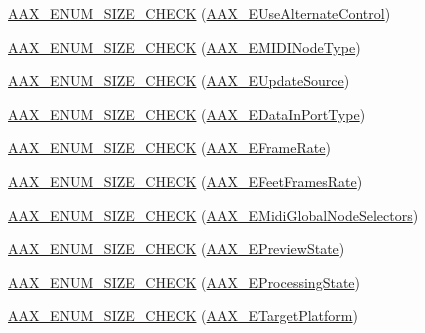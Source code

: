 \begin{DoxyCompactItemize}
\item 
\hyperlink{a00206_a7becfade6ef2832f33559c576c0229b8}{A\+A\+X\+\_\+\+E\+N\+U\+M\+\_\+\+S\+I\+Z\+E\+\_\+\+C\+H\+E\+C\+K} (\hyperlink{a00206_abbcc8b4e8207262a5dd9e32047a51a29}{A\+A\+X\+\_\+\+E\+Use\+Alternate\+Control})
\item 
\hyperlink{a00206_a4846f0566f755423b00339b1d0c30286}{A\+A\+X\+\_\+\+E\+N\+U\+M\+\_\+\+S\+I\+Z\+E\+\_\+\+C\+H\+E\+C\+K} (\hyperlink{a00206_a5e1dffce35d05990dbbad651702678e4}{A\+A\+X\+\_\+\+E\+M\+I\+D\+I\+Node\+Type})
\item 
\hyperlink{a00206_aff578795a76f6d946b6f22297cf34122}{A\+A\+X\+\_\+\+E\+N\+U\+M\+\_\+\+S\+I\+Z\+E\+\_\+\+C\+H\+E\+C\+K} (\hyperlink{a00206_a30be0398faf20c6b121239eb9399f3f7}{A\+A\+X\+\_\+\+E\+Update\+Source})
\item 
\hyperlink{a00206_af6976d8f2262bc8a5c4764a400369c0b}{A\+A\+X\+\_\+\+E\+N\+U\+M\+\_\+\+S\+I\+Z\+E\+\_\+\+C\+H\+E\+C\+K} (\hyperlink{a00206_ab5677b173ad8647c24d34d28272d11fc}{A\+A\+X\+\_\+\+E\+Data\+In\+Port\+Type})
\item 
\hyperlink{a00206_aa81099aa0185ad9be2192c1a5b7e00ce}{A\+A\+X\+\_\+\+E\+N\+U\+M\+\_\+\+S\+I\+Z\+E\+\_\+\+C\+H\+E\+C\+K} (\hyperlink{a00206_a1271a51553bf508de59864334111aa8f}{A\+A\+X\+\_\+\+E\+Frame\+Rate})
\item 
\hyperlink{a00206_a91aa2cdae6c91defa1505e50e841859c}{A\+A\+X\+\_\+\+E\+N\+U\+M\+\_\+\+S\+I\+Z\+E\+\_\+\+C\+H\+E\+C\+K} (\hyperlink{a00206_a8a0c9dafef741a26ee8c06f7285a0dfa}{A\+A\+X\+\_\+\+E\+Feet\+Frames\+Rate})
\item 
\hyperlink{a00206_a41a000edf84a9a60ce852e7707deee96}{A\+A\+X\+\_\+\+E\+N\+U\+M\+\_\+\+S\+I\+Z\+E\+\_\+\+C\+H\+E\+C\+K} (\hyperlink{a00206_a349dae6bc64bda67a5440cbc6637f92d}{A\+A\+X\+\_\+\+E\+Midi\+Global\+Node\+Selectors})
\item 
\hyperlink{a00206_a4f26045654b3373a3ddd5e3323e4c2a0}{A\+A\+X\+\_\+\+E\+N\+U\+M\+\_\+\+S\+I\+Z\+E\+\_\+\+C\+H\+E\+C\+K} (\hyperlink{a00206_a12b280d7ccf22568759f8deb1fe1d6a8}{A\+A\+X\+\_\+\+E\+Preview\+State})
\item 
\hyperlink{a00206_abf9e76227a06a4e03facdc9740c663af}{A\+A\+X\+\_\+\+E\+N\+U\+M\+\_\+\+S\+I\+Z\+E\+\_\+\+C\+H\+E\+C\+K} (\hyperlink{a00206_a6ec854be40c8cf810dec97de3e56c0a7}{A\+A\+X\+\_\+\+E\+Processing\+State})
\item 
\hyperlink{a00206_a8e78dfa90ba7ea61b8260f8d919c8428}{A\+A\+X\+\_\+\+E\+N\+U\+M\+\_\+\+S\+I\+Z\+E\+\_\+\+C\+H\+E\+C\+K} (\hyperlink{a00206_a19e8cc27f59bb9bb4039b00fadb3cb83}{A\+A\+X\+\_\+\+E\+Target\+Platform})
\item 

\end{DoxyCompactItemize}
